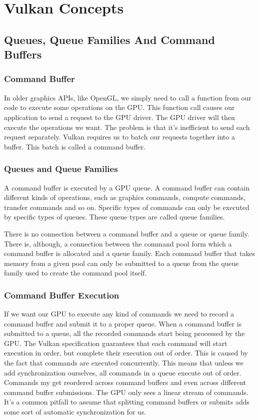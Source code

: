 \chapter{Vulkan Concepts}

\section{Queues, Queue Families And Command Buffers}

\subsection{Command Buffer}

In older graphics APIs, like OpenGL, we simply need to call a function
from our code to execute some operations on the GPU.
This function call causes our application to send a request to the GPU driver.
The GPU driver will then execute the operations we want.
The problem is that it's inefficient to send each request separately.
Vulkan requires us to batch our requests together into a buffer.
This batch is called a command buffer.

\subsection{Queues and Queue Families}

A command buffer is executed by a GPU queue.
A command buffer can contain different kinds of operations, such as graphics
commands, compute commands, transfer commands and so on.
Specific types of commands can only be executed by specific types of queues.
These queue types are called queue families.

There is no connection between a command buffer and a queue or queue family.
There is, although, a connection between the command pool form which a command
buffer is allocated and a queue family.
Each command buffer that takes memory from a given pool can only be submitted
to a queue from the queue family used to create the command pool itself.

\subsection{Command Buffer Execution}

If we want our GPU to execute any kind of commands we need to record a command
buffer and submit it to a proper queue.
When a command buffer is submitted to a queue, all the recorded commands start
being processed by the GPU.
The Vulkan specification guarantees that each command will start execution
in order, but complete their execution out of order.
This is caused by the fact that commands are executed concurrently.
This means that unless we add synchronization ourselves, all commands
in a queue execute out of order.
Commands my get reordered across command buffers and even across different
command buffer submissions.
The GPU only sees a linear stream of commands.
It's a common pitfall to assume that splitting command buffers or submits adds
some sort of automatic synchronization for us.

